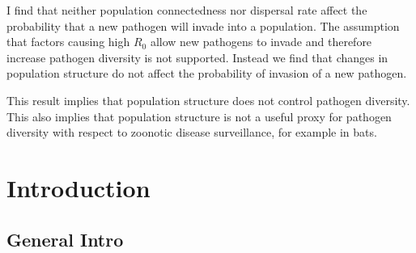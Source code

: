 I find that neither population connectedness nor dispersal rate affect the probability that a new pathogen will invade into a population.
The assumption that factors causing high $R_0$ allow new pathogens to invade and therefore increase pathogen diversity is not supported.
Instead we find that changes in population structure do not affect the probability of invasion of a new pathogen.
 

This result implies that population structure does not control pathogen diversity.
This also implies that population structure is not a useful proxy for pathogen diversity with respect to zoonotic disease surveillance, for example in bats.








\clearpage
\section{Introduction}





\subsection{General Intro}



